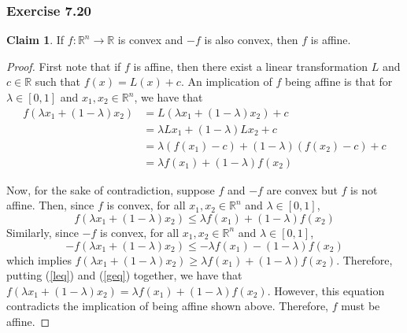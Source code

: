 \documentclass[letterpaper,12pt]{article}
\theoremstyle{definition}
\newtheorem{claim}[theorem]{Claim}
\begin{document}
\subsubsection*{Exercise 7.20}
\begin{claim}
 If $f: \mathbb{R}^n \to \mathbb{R}$ is convex and $-f$ is also convex, then $f$ is affine.
\end{claim}
\begin{proof}
	First note that if $f$ is affine, then there exist a linear transformation $L$ and $c \in \mathbb{R}$ such that $f(x) = L(x) + c$. An implication of $f$ being affine is that for $\lambda \in [0,1]$ and $x_1, x_2 \in \mathbb{R}^n$, we have that 
	\begin{align*}
	f(\lambda x_1 + (1 - \lambda)x_2) &= L(\lambda x_1 + (1 - \lambda)x_2) + c \\
	&= \lambda Lx_1 + (1 - \lambda)L x_2  + c \tag{since $L$ is a linear transformation} \\
	&= \lambda (f(x_1) - c) + (1 - \lambda) (f(x_2) - c) + c  \tag{since $f$ is affine} \\
	&= \lambda f(x_1) + (1 - \lambda) f(x_2)
	\end{align*}
	
	Now, for the sake of contradiction, suppose $f$ and $-f$ are convex but $f$ is not affine. Then, since $f$ is convex, for all $x_1, x_2 \in \mathbb{R}^n$ and $\lambda \in [0,1]$,
	\begin{equation}\label{leq}
	f(\lambda x_1 + (1 - \lambda) x_2) \leq \lambda f(x_1) + (1 - \lambda) f(x_2) 
	\end{equation}
	Similarly, since $-f$ is convex, for all $x_1, x_2 \in \mathbb{R}^n$ and $\lambda \in [0,1]$,
	\begin{equation}\label{geq}
	-f(\lambda x_1 + (1 - \lambda) x_2) \leq -\lambda f(x_1) -(1 - \lambda) f(x_2) 
	\end{equation}
	which implies $f(\lambda x_1 + (1 - \lambda) x_2) \geq \lambda f(x_1) + (1 - \lambda) f(x_2)$. Therefore, putting (\ref{leq}) and (\ref{geq}) together, we have that $f(\lambda x_1 + (1 - \lambda) x_2) = \lambda f(x_1) + (1 - \lambda) f(x_2)$. However, this equation contradicts the implication of being affine shown above. Therefore, $f$ must be affine.
\end{proof}
\end{document}
